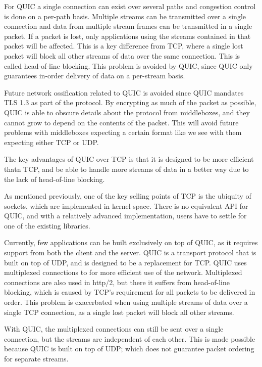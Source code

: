 For QUIC a single connection can exist over several paths and
congestion control is done on a per-path basis. Multiple streams
can be transmitted over a single connection and data from
multiple stream frames can be transmitted in a single packet.
If a packet is lost, only applications using the streams contained
in that packet will be affected. This is a key difference from TCP,
where a single lost packet will block all other streams of data
over the same connection. This is called head-of-line blocking.
This problem is avoided by QUIC, since QUIC only guarantees
in-order delivery of data on a per-stream basis.

Future network ossification related to QUIC is avoided
since QUIC mandates TLS 1.3 as part of the protocol.
By encrypting as much of the packet as possible, QUIC is able to
obscure details about the protocol from middleboxes, and
they cannot grow to depend on the contents of the packet. This
will avoid future problems with middleboxes expecting a certain
format like we see with them expecting either TCP or UDP.

The key advantages of QUIC over TCP is that it is designed to be
more efficient thatn TCP, and be able to handle more streams of
data in a better way due to the lack of head-of-line blocking.

As mentioned previously, one of the key selling points of TCP is
the ubiquity of sockets, which are implemented in kernel space.
There is no equivalent API for QUIC, and with a relatively
advanced implementation, users have to settle for one of the
existing libraries.

Currently, few applications can be built exclusively on top of
QUIC, as it requires support from both the client and the
server. QUIC is a transport protocol that is built on top of
UDP, and is designed to be a replacement for TCP. QUIC uses
multiplexed connections to for more efficient use of the
network. Multiplexed connections are also used in http/2, but
there it suffers from head-of-line blocking, which is caused by
TCP's requirement for all packets to be delivered in order. This
problem is exacerbated when using multiple streams of data over
a single TCP connection, as a single lost packet will block all
other streams.

With QUIC, the multiplexed connections can still be sent over a
single connection, but the streams are independent of each
other. This is made possible because QUIC is built on top of
UDP; which does not guarantee packet ordering for separate
streams.

